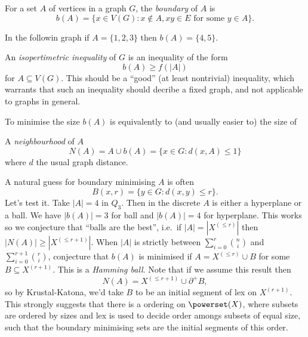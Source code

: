 \documentclass[a4paper]{article}
\newcommand{\shadow}{\partial}
\begin{document}
\begin{definition}[boundary]
  For a set \(A\) of vertices in a graph \(G\), the \emph{boundary} of \(A\) is
  \[
    b(A) = \{x \in V(G): x \notin A, xy \in E \text{ for some } y \in A\}.
  \]
\end{definition}

\begin{eg}
  In the followin graph if \(A = \{1, 2, 3\}\) then \(b(A) = \{4, 5\}\).
  \begin{center}
  \end{center}
\end{eg}

An \emph{isopertimetric inequality} of \(G\) is an inequality of the form
\[
  b(A) \geq f(|A|)
\]
for \(A \subseteq V(G)\). This should be a ``good'' (at least nontrivial) inequality, which warrants that such an inequality should decribe a fixed graph, and not applicable to graphs in general.

To minimise the size \(b(A)\) is equivalently to (and usually easier to) the size of

\begin{definition}[neighbourhood]
  A \emph{neighbourhood} of \(A\)
  \[
    N(A) = A \cup b(A) = \{x \in G: d(x, A) \leq 1\}
  \]
  where \(d\) the usual graph distance.
\end{definition}

A natural guess for boundary minimising \(A\) is often
\[
  B(x, r) = \{y \in G: d(x, y) \leq r\}.
\]
Let's test it. Take \(|A| = 4\) in \(Q_3\). Then in the discrete \(A\) is either a hyperplane or a ball. We have \(|b(A)| = 3\) for ball and \(|b(A)| = 4\) for hyperplane. This works so we conjecture that ``balls are the best'', i.e.\ if \(|A| = |X^{(\leq r)}|\) then \(|N(A)| \geq |X^{(\leq r + 1)}|\). When \(|A|\) is strictly between \(\sum_{i = 0}^r \binom{n}{i}\) and \(\sum_{i = 0}^{r + 1} \binom{r}{i}\), conjecture that \(b(A)\) is minimised if \(A = X^{(\leq r)} \cup B\) for some \(B \subseteq X^{(r + 1)}\). This is a \emph{Hamming ball}. Note that if we assume this result then
\[
  N(A) = X^{(\leq r + 1)} \cup \shadow^+ B,
\]
so by Krustal-Katona, we'd take \(B\) to be an initial segment of lex on \(X^{(r + 1)}\). This strongly suggests that there is a ordering on \(\powerset(X)\), where subsets are ordered by sizes and lex is used to decide order amongs subsets of equal size, such that the boundary minimising sets are the initial segments of this order.
\end{document}
